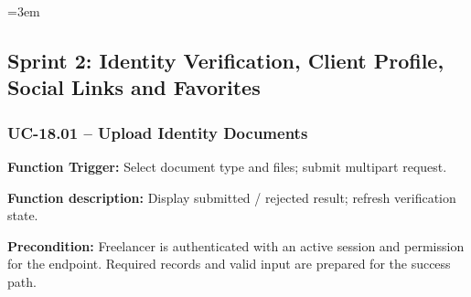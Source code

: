 \begingroup\sloppy\emergencystretch=3em\relax
\subsection{Sprint 2: Identity Verification, Client Profile, Social Links and Favorites}

\subsubsection{UC-18.01 -- Upload Identity Documents}
\textbf{Function Trigger:} Select document type and files; submit multipart request.

\textbf{Function description:} Display submitted /\allowbreak{} rejected result; refresh verification state.

\textbf{Precondition:} Freelancer is authenticated with an active session and permission for the endpoint. Required records and valid input are prepared for the success path.

